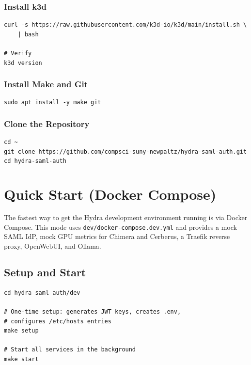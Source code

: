\documentclass[11pt,a4paper]{article}
\newcommand{\cmdref}[1]{\texttt{#1}}
\begin{document}
\subsubsection{Install k3d}

\begin{lstlisting}[style=bash]
curl -s https://raw.githubusercontent.com/k3d-io/k3d/main/install.sh \
    | bash

# Verify
k3d version
\end{lstlisting}

\subsubsection{Install Make and Git}

\begin{lstlisting}[style=bash]
sudo apt install -y make git
\end{lstlisting}

\subsubsection{Clone the Repository}

\begin{lstlisting}[style=bash]
cd ~
git clone https://github.com/compsci-suny-newpaltz/hydra-saml-auth.git
cd hydra-saml-auth
\end{lstlisting}

\section{Quick Start (Docker Compose)}
\label{sec:quickstart}

The fastest way to get the Hydra development environment running is via
Docker Compose. This mode uses \cmdref{dev/docker-compose.dev.yml} and
provides a mock SAML IdP, mock GPU metrics for Chimera and Cerberus, a
Traefik reverse proxy, OpenWebUI, and Ollama.

\subsection{Setup and Start}

\begin{lstlisting}[style=bash]
cd hydra-saml-auth/dev

# One-time setup: generates JWT keys, creates .env,
# configures /etc/hosts entries
make setup

# Start all services in the background
make start
\end{lstlisting}
\end{document}
